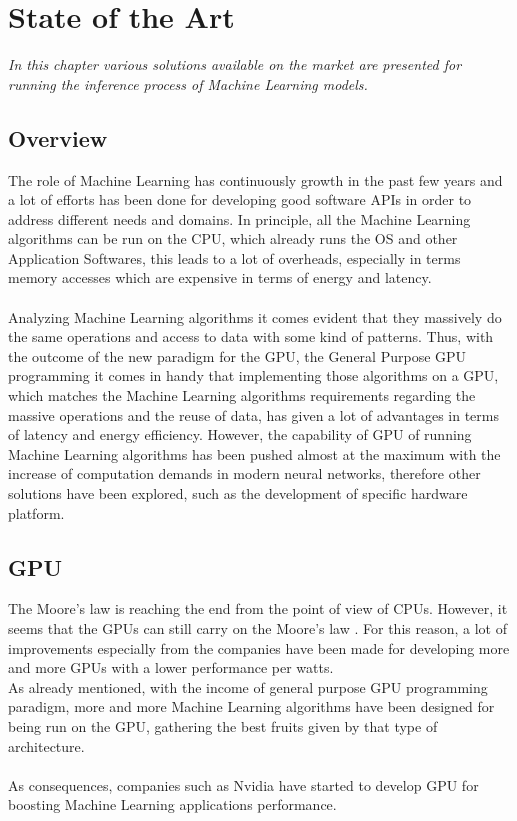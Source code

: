 \chapter{State of the Art}
\textit{In this chapter various solutions available on the market are presented for running the inference process of Machine Learning models.}

\section{Overview}
The role of Machine Learning has continuously growth in the past few years and a lot of efforts has been done for developing good software APIs in order to address different needs and domains. \newline In principle, all the Machine Learning algorithms can be run on the CPU, which already runs the OS and other Application Softwares, this leads to a lot of overheads, especially in terms memory accesses which are expensive in terms of energy and latency. \\\\
Analyzing Machine Learning algorithms it comes evident that they massively do the same operations and access to data with some kind of patterns. Thus, with the outcome of the new paradigm for the GPU, the General Purpose GPU programming it comes in handy that implementing those algorithms on a GPU, which matches the Machine Learning algorithms requirements regarding the massive operations and the reuse of data, has given a lot of advantages in terms of latency and energy efficiency. However, the capability of GPU of running Machine Learning algorithms has been pushed almost at the maximum with the increase of computation demands in modern neural networks, therefore other solutions have been explored, such as the development of specific hardware platform.

\section{GPU}
The Moore's law is reaching the end from the point of view of CPUs. However, it seems that the GPUs can still carry on the Moore's law \cite{5496638}.\newline
For this reason, a lot of improvements especially from the companies have been made for developing more and more GPUs with a lower performance per watts.\\
As already mentioned, with the income of general purpose GPU programming paradigm, more and more Machine Learning algorithms have been designed for being run on the GPU, gathering the best fruits given by that type of architecture.\\\\
As consequences, companies such as Nvidia have started to develop GPU for boosting Machine Learning applications performance.
